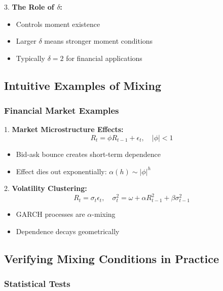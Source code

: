\documentclass[12pt,article]{memoir}
\begin{document}
3. \textbf{The Role of $\delta$:}
   \begin{itemize}
       \item Controls moment existence
       \item Larger $\delta$ means stronger moment conditions
       \item Typically $\delta = 2$ for financial applications
   \end{itemize}

\subsection{Intuitive Examples of Mixing}

\subsubsection{Financial Market Examples}

1. \textbf{Market Microstructure Effects:}
\begin{equation}
    R_t = \phi R_{t-1} + \epsilon_t, \quad |\phi| < 1
\end{equation}
   \begin{itemize}
       \item Bid-ask bounce creates short-term dependence
       \item Effect dies out exponentially: $\alpha(h) \sim |\phi|^h$
   \end{itemize}

2. \textbf{Volatility Clustering:}
\begin{equation}
    R_t = \sigma_t \epsilon_t, \quad \sigma_t^2 = \omega + \alpha R_{t-1}^2 + \beta \sigma_{t-1}^2
\end{equation}
   \begin{itemize}
       \item GARCH processes are $\alpha$-mixing
       \item Dependence decays geometrically
   \end{itemize}

\subsection{Verifying Mixing Conditions in Practice}

\subsubsection{Statistical Tests}
\end{document}
